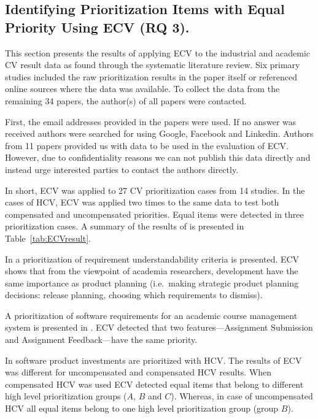 \subsection{\label{rq3}Identifying Prioritization Items with Equal Priority Using ECV (RQ 3).}

This section presents the results of applying ECV to the industrial and academic CV result data as found through the systematic literature review. Six primary studies included the raw prioritization results in the paper itself or referenced online sources where the data was available. To collect the data from the remaining 34 papers, the author(s) of all papers were contacted.

First, the email addresses provided in the papers were used. If no answer was received authors were searched for using Google, Facebook and Linkedin. Authors from 11 papers provided us with data to be used in the evaluation of ECV. However, due to confidentiality reasons we can not publish this data directly and instead urge interested parties to contact the authors directly.

In short, ECV was applied to 27 CV prioritization cases from 14 studies.
In the cases of HCV, ECV was applied two times to the same data to test both compensated and uncompensated priorities. Equal items were detected in three prioritization cases. A summary of the results of is presented in Table~\ref{tab:ECVresult}.

In \citep{Svahnberg2008} a prioritization of requirement understandability
criteria is presented. ECV shows that from the viewpoint of academia
researchers, development have the same importance as
product planning (i.e.\ making strategic product planning decisions: release
planning, choosing which requirements to dismiss).

A prioritization of software requirements for an academic course management system is presented in \citep{Berander2009a}. ECV detected that two features---Assignment Submission and Assignment Feedback---have the same priority.

In \citep{Barney2009} software product investments are prioritized with HCV.
The results of ECV was different for uncompensated and compensated HCV results.
When compensated HCV was used ECV detected equal items that belong to different high level prioritization groups ($A$, $B$ and $C$).
Whereas, in case of uncompensated HCV all equal items belong to one high level prioritization group (group $B$).